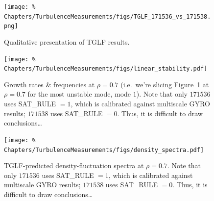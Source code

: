 \begin{figure}[h!]
  \centering
  \texttt{[image: \%
    Chapters/TurbulenceMeasurements/figs/TGLF\_171536\_vs\_171538.png]}
  \caption[Qualitative presentation of TGLF results]{%
    Qualitative presentation of TGLF results.
  }
\label{fig:TurbulenceMeasurements:TGLF_171536_vs_171538}
\end{figure}

\begin{figure}[h!]
  \centering
  \texttt{[image: \%
    Chapters/TurbulenceMeasurements/figs/linear\_stability.pdf]}
  \caption[Growth rates \& frequencies at $\rho=0.7$]{%
    Growth rates \& frequencies at $\rho=0.7$
    (i.e.\ we're slicing
    Figure~\ref{fig:TurbulenceMeasurements:TGLF_171536_vs_171538}
    at $\rho = 0.7$ for the most unstable mode, mode $1$).
    Note that only $171536$ uses SAT\_RULE $= 1$,
    which is calibrated against multiscale GYRO results;
    $171538$ uses SAT\_RULE $= 0$.
    Thus, it is difficult to draw conclusions\ldots
  }
\label{fig:TurbulenceMeasurements:linear_stability}
\end{figure}

\begin{figure}[h!]
  \centering
  \texttt{[image: \%
    Chapters/TurbulenceMeasurements/figs/density\_spectra.pdf]}
  \caption[TGLF-predicted density-fluctuation spectra at $\rho=0.7$]{%
    TGLF-predicted density-fluctuation spectra at $\rho=0.7$.
    Note that only $171536$ uses SAT\_RULE $= 1$,
    which is calibrated against multiscale GYRO results;
    $171538$ uses SAT\_RULE $= 0$.
    Thus, it is difficult to draw conclusions\ldots
  }
\label{fig:TurbulenceMeasurements:density_spectra}
\end{figure}




